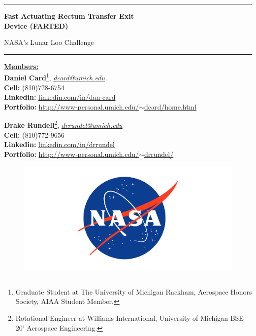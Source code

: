 \thispagestyle{empty}
    
\rule{\textwidth}{3pt}

\vspace{1cm}
\textbf{\LARGE{Fast Actuating Rectum Transfer Exit}\\ Device (FARTED)}

NASA's Lunar Loo Challenge

\rule{\textwidth}{1pt}

\vspace{1cm}
\begin{flushleft}
    \underline{\textbf{\LARGE{Members:}}}\\
    \textbf{Daniel Card}\footnote{Graduate Student at The University of Michigan Rackham, Aerospace Honors Society, AIAA Student Member.}, \href{mailto:dcard@umich.edu}{\textit{dcard@umich.edu}}\\
    \textbf{Cell:} (810)728-6754\\
    \textbf{Linkedin:} \href{http://www.linkedin.com/in/dan-card}{linkedin.com/in/dan-card}\\
    \textbf{Portfolio:}  \href{http://www-personal.umich.edu/~dcard/home.html}{http://www-personal.umich.edu/$\sim$dcard/home.html}

    
    \textbf{Drake Rundell}\footnote{Rotational Engineer at Williams International, University of Michigan BSE 20' Aerospace Engineering.}, \href{mailto:drrundel}{\textit{drrundel@umich.edu}}\\
    \textbf{Cell:} (810)772-9656\\
    \textbf{Linkedin:} \href{http://www.linkedin.com/in/drrundel}{linkedin.com/in/drrundel}\\
    \textbf{Portfolio:}  \href{http://www-personal.umich.edu/~drrundel/}{http://www-personal.umich.edu/$\sim$drrundel/}
\end{flushleft}

\begin{figure}[h]
    \centering
    \includegraphics[width = \linewidth]{administrative/nasa-logo-web-rgb.png}
\end{figure}

\vfill
